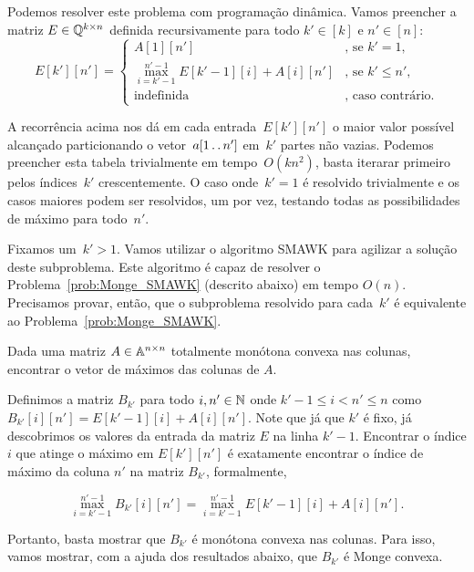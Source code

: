 Podemos resolver este problema com programação dinâmica. Vamos preencher a matriz $E \in \mathbb{Q}^{k \times n}$ definida recursivamente para todo $k' \in [k]$ e $n' \in [n]$: 
$$ E[k'][n'] = \begin{cases}
    A[1][n']                                               & \text{, se } k'= 1 \text{,} \\[2pt]
    \max\limits_{i=k'-1}^{n'-1} E[k'-1][i] + A[i][n']     & \text{, se } k' \leq n' \text{,} \\[2pt]
    \text{indefinida }                                    & \text{, caso contrário.}
\end{cases} $$

A recorrência acima nos dá em cada entrada~$E[k'][n']$ o maior valor possível alcançado particionando o vetor~$a[1 \,.\,.\, n']$ em~$k'$ partes não vazias. Podemos preencher esta tabela trivialmente em tempo~$O(kn^2)$, basta iterarar primeiro pelos índices~$k'$ crescentemente. O caso onde~$k' = 1$ é resolvido trivialmente e os casos maiores podem ser resolvidos, um por vez, testando todas as possibilidades de máximo para todo~$n'$.  

Fixamos um~$k' > 1$. Vamos utilizar o algoritmo SMAWK para agilizar a solução deste subproblema. Este algoritmo é capaz de resolver o Problema~\ref{prob:Monge_SMAWK} (descrito abaixo) em tempo $O(n)$. Precisamos provar, então, que o subproblema resolvido para cada~$k'$ é equivalente ao Problema~\ref{prob:Monge_SMAWK}.

\begin{prob} \label{prob:Monge_SMAWK}
Dada uma matriz $A \in \mathbb{A}^{n \times n}$ totalmente monótona convexa nas colunas, encontrar o vetor de máximos das colunas de $A$.
\end{prob}

Definimos a matriz $B_{k'}$ para todo $i,n' \in \mathbb{N}$ onde $k'-1 \leq i < n' \leq n$ como $B_{k'}[i][n'] = E[k'-1][i] + A[i][n']$. Note que já que $k'$ é fixo, já descobrimos os valores da entrada da matriz $E$ na linha $k'-1$. Encontrar o índice $i$ que atinge o máximo em $E[k'][n']$ é exatamente encontrar o índice de máximo da coluna $n'$ na matriz $B_{k'}$, formalmente, 

$$\max\limits_{i=k'-1}^{n'-1} B_{k'}[i][n'] = \max\limits_{i=k'-1}^{n'-1} E[k'-1][i] + A[i][n'] \text{.}$$

Portanto, basta mostrar que $B_{k'}$ é monótona convexa nas colunas. Para isso, vamos mostrar, com a ajuda dos resultados abaixo, que $B_{k'}$ é Monge convexa.
    

